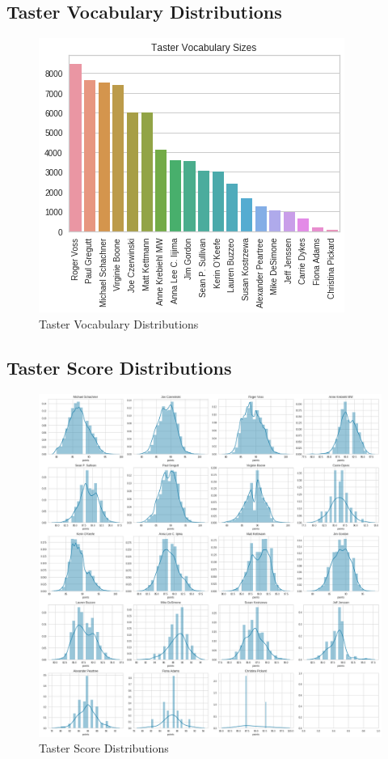 \documentclass[12pt]{IEEEtran}
\begin{document}
\subsection{Taster Vocabulary Distributions}
\begin{figure}[H]
    \centering
    \includegraphics[width=\columnwidth]{taster_vocabularies}
    \caption{Taster Vocabulary Distributions}
\end{figure}

\subsection{Taster Score Distributions}
\begin{figure}
    \centering
    \includegraphics[width=\linewidth]{taster_score_distributions}
    \caption{Taster Score Distributions}
\end{figure}
\end{document}
